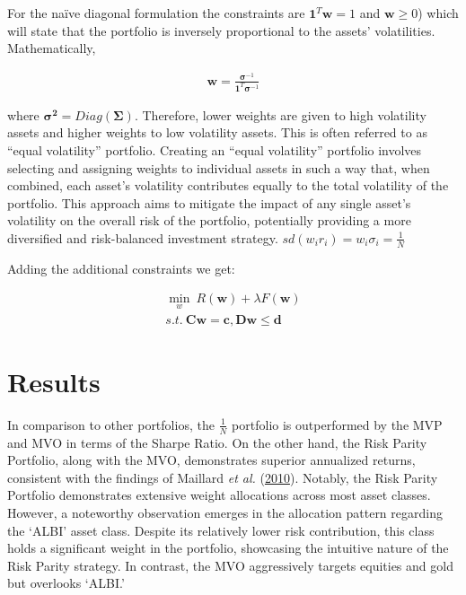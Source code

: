 \documentclass[12pt,preprint, authoryear]{elsarticle}
\numberwithin{equation}{section}
\numberwithin{figure}{section}
\numberwithin{table}{section}
\begin{document}
For the \textnormal{na\"{i}ve} diagonal formulation the constraints are
\(\boldsymbol{1}^T \boldsymbol{w} =1\) and \(\boldsymbol{w} \ge 0\))
which will state that the portfolio is inversely proportional to the
assets' volatilities. Mathematically,

\begin{align}
\boldsymbol{w} =\frac{\boldsymbol{\sigma}^{-1}}{\boldsymbol{1}^T \boldsymbol{\sigma}^{-1}}
\end{align}

where \(\boldsymbol{\sigma^2}=Diag(\boldsymbol{\Sigma})\). Therefore,
lower weights are given to high volatility assets and higher weights to
low volatility assets. This is often referred to as ``equal volatility''
portfolio. Creating an ``equal volatility'' portfolio involves selecting
and assigning weights to individual assets in such a way that, when
combined, each asset's volatility contributes equally to the total
volatility of the portfolio. This approach aims to mitigate the impact
of any single asset's volatility on the overall risk of the portfolio,
potentially providing a more diversified and risk-balanced investment
strategy. \(sd(w_i r_i)=w_i \sigma_i=\frac{1}{N}\)

Adding the additional constraints we get:

\begin{align}
\min_{w}\ R(\boldsymbol{w}) + \lambda F(\boldsymbol{w})  \\
s.t.\ \boldsymbol{Cw}=\boldsymbol{c}, \boldsymbol{Dw}\le\boldsymbol{d}
\end{align}

\hypertarget{results}{%
\section{\texorpdfstring{Results \label{-}}{Results }}\label{results}}

In comparison to other portfolios, the \(\frac{1}{N}\) portfolio is
outperformed by the MVP and MVO in terms of the Sharpe Ratio. On the
other hand, the Risk Parity Portfolio, along with the MVO, demonstrates
superior annualized returns, consistent with the findings of Maillard
\emph{et al.} (\protect\hyperlink{ref-maillard2010properties}{2010}).
Notably, the Risk Parity Portfolio demonstrates extensive weight
allocations across most asset classes. However, a noteworthy observation
emerges in the allocation pattern regarding the `ALBI' asset class.
Despite its relatively lower risk contribution, this class holds a
significant weight in the portfolio, showcasing the intuitive nature of
the Risk Parity strategy. In contrast, the MVO aggressively targets
equities and gold but overlooks `ALBI.'
\end{document}
